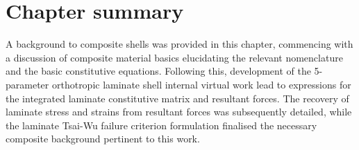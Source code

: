 \section{Chapter summary}
A background to composite shells was provided in this chapter, commencing with a discussion of composite material basics elucidating the relevant nomenclature and the basic constitutive equations. Following this, development of the 5-parameter orthotropic laminate shell internal virtual work lead to expressions for the integrated laminate constitutive matrix and resultant forces. The recovery of laminate stress and strains from resultant forces was subsequently detailed, while the laminate Tsai-Wu failure criterion formulation finalised the necessary composite background pertinent to this work.

